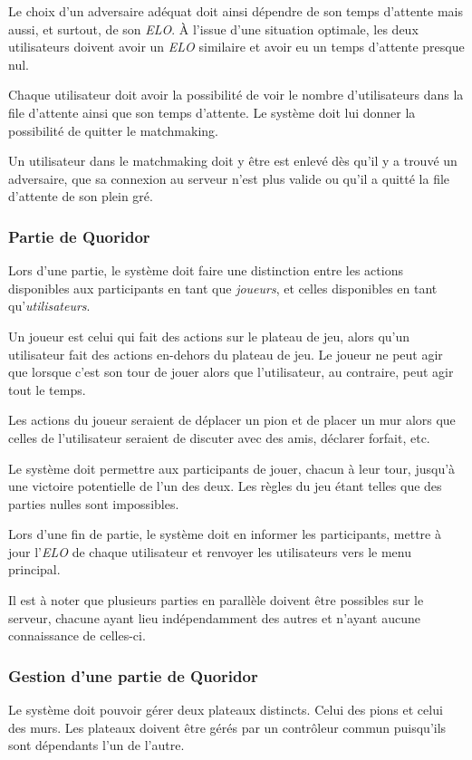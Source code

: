 Le choix d'un adversaire adéquat doit ainsi dépendre de son temps
d'attente mais aussi, et surtout, de son \emph{ELO}.
À l'issue d'une situation optimale, les deux utilisateurs doivent
avoir un \emph{ELO} similaire et avoir eu un temps d'attente presque
nul.

Chaque utilisateur doit avoir la possibilité de voir le nombre d'utilisateurs
dans la file d'attente ainsi que son temps d'attente. Le
système doit lui donner la possibilité de quitter le
matchmaking.

Un utilisateur dans le matchmaking doit y être est enlevé
dès qu'il y a trouvé un adversaire, que sa connexion au
serveur n'est plus valide ou qu'il a quitté la file
d'attente de son plein gré.

\subsubsection{Partie de Quoridor}

Lors d'une partie, le système doit faire une distinction
entre les actions disponibles aux participants en tant que
\emph{joueurs}, et
celles disponibles en tant qu'\emph{utilisateurs}.

Un joueur est celui qui fait des actions sur le
plateau de jeu, alors qu'un utilisateur fait des
actions en-dehors du plateau de jeu. Le joueur ne peut agir
que lorsque c'est son tour de jouer alors que l'utilisateur, au
contraire, peut agir tout le temps.

Les actions du joueur seraient de déplacer un pion
et de placer un mur alors que celles de l'utilisateur
seraient de discuter avec des amis, déclarer forfait,
etc.

Le système doit permettre aux participants de jouer,
chacun à leur tour, jusqu'à une victoire potentielle
de l'un des deux. Les règles du jeu étant telles que
des parties nulles sont impossibles.

Lors d'une fin de partie, le système doit en informer les
participants, mettre à jour l'\emph{ELO} de chaque
utilisateur et renvoyer les utilisateurs vers le menu principal.

Il est à noter que plusieurs parties en parallèle doivent être
possibles sur le serveur, chacune ayant lieu indépendamment des
autres et n'ayant aucune connaissance de celles-ci.


\subsubsection{Gestion d'une partie de Quoridor}

Le système doit pouvoir gérer deux plateaux distincts.
Celui des pions et celui des murs. Les plateaux
doivent être gérés par un contrôleur commun puisqu'ils
sont dépendants l'un de l'autre.




